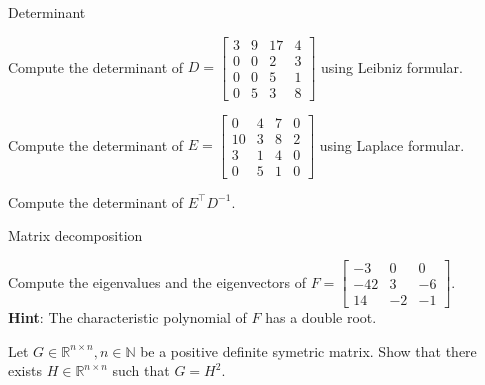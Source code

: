 \documentclass[
	ngerman,
	points=true,%
    solution=true,
    accentcolor=9c,
    colorbacktitle
	]{tudaexercise}
\begin{document}
\begin{task}{Determinant}
\begin{subtask}
Compute the determinant of 
$D = 
\begin{bmatrix}
    3 & 9 & 17 & 4\\
    0 & 0 & 2  & 3\\
    0 & 0 & 5  & 1\\
    0 & 5 & 3  & 8
\end{bmatrix}
$ using Leibniz formular.
\end{subtask}
\begin{solution}

\end{solution}

\begin{subtask}
Compute the determinant of 
$E = 
\begin{bmatrix}
    0  & 4 & 7 & 0\\
    10 & 3 & 8 & 2\\
    3  & 1 & 4 & 0\\
    0  & 5 & 1 & 0
\end{bmatrix}
$ using Laplace formular.
\end{subtask}
\begin{solution}

\end{solution}

\begin{subtask}
Compute the determinant of $E^{\intercal} D^{-1}$.
\end{subtask}
\begin{solution}

\end{solution}
\end{task}

\begin{task}{Matrix decomposition}
\begin{subtask}
Compute the eigenvalues and the eigenvectors of 
$F = 
\begin{bmatrix}
    -3  & 0  & 0  \\
    -42 & 3  & -6 \\
    14  & -2 & -1
\end{bmatrix}$.\\
\textbf{Hint}: The characteristic polynomial of $F$ has a double root.
\end{subtask}
\begin{solution}

\end{solution}

\begin{subtask}
Let $G \in \mathbb{R}^{n \times n}, n \in \mathbb{N}$ be a positive definite symetric matrix. Show that there exists $H \in \mathbb{R}^{n \times n}$ such that $G = H^2$.
\end{subtask}
\begin{solution}

\end{solution}
\end{task}
\end{document}
